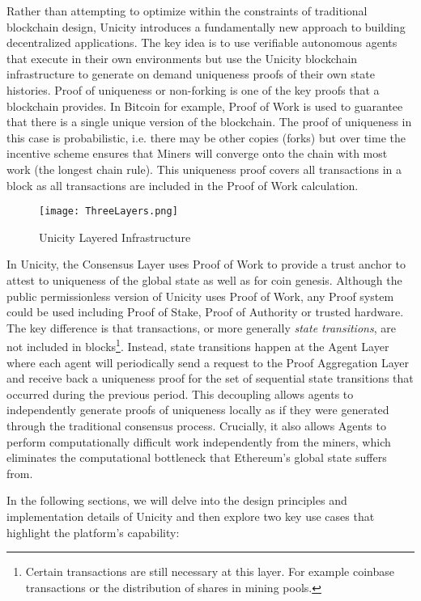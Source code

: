 \documentclass{article}
\begin{document}
Rather than attempting to optimize within the constraints of traditional blockchain design, Unicity introduces a fundamentally new approach to building decentralized applications. The key idea is to use verifiable autonomous agents that execute in their own environments but use the Unicity blockchain infrastructure to generate on demand uniqueness proofs of their own state histories. Proof of uniqueness or non-forking is one of the key proofs that a blockchain provides. In Bitcoin for example, Proof of Work is used to guarantee that there is a single unique version of the blockchain. The proof of uniqueness in this case is probabilistic, i.e. there may be other copies (forks) but over time the incentive scheme ensures that Miners will converge onto the chain with most work (the longest chain rule). This uniqueness proof covers all transactions in a block as all transactions are included in the Proof of Work calculation. 


\begin{figure}[htbp]
    \centering
    \texttt{[image: ThreeLayers.png]}
    \caption{Unicity Layered Infrastructure}
    \label{fig:layers}
\end{figure}


In Unicity, the Consensus Layer uses Proof of Work to provide a trust anchor to attest to uniqueness of the global state as well as for coin genesis. Although the public permissionless version of Unicity uses Proof of Work, any Proof system could be used including Proof of Stake, Proof of Authority or trusted hardware. The key difference is that transactions, or more generally \textit{state transitions}, are not included in blocks\footnote{Certain transactions are still necessary at this layer. For example coinbase transactions or the distribution of shares in mining pools.}. Instead, state transitions happen at the Agent Layer where each agent will periodically send a request to the Proof Aggregation Layer and receive back a uniqueness proof for the set of sequential state transitions that occurred during the previous period. This decoupling allows agents to independently generate proofs of uniqueness locally as if they were generated through the traditional consensus process. Crucially, it also allows Agents to perform computationally difficult work independently from the miners, which eliminates the computational bottleneck that Ethereum's global state suffers from.

\vspace{2mm}

In the following sections, we will delve into the design principles and implementation details of Unicity and then explore two key use cases that highlight the platform's capability:
\end{document}
